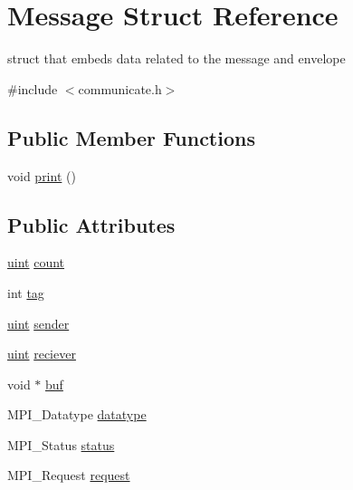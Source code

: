 \hypertarget{structMessage}{}\section{Message Struct Reference}
\label{structMessage}


struct that embeds data related to the message and envelope  




{\ttfamily \#include $<$communicate.\+h$>$}

\subsection*{Public Member Functions}
\begin{DoxyCompactItemize}
\item 
void \mbox{\hyperlink{structMessage_a9d9fb4752c49738110413a6c2c02ab2d}{print}} ()
\end{DoxyCompactItemize}
\subsection*{Public Attributes}
\begin{DoxyCompactItemize}
\item 
\mbox{\hyperlink{definitions_8h_a69aa29b598b851b0640aa225a9e5d61d}{uint}} \mbox{\hyperlink{structMessage_a66dd9a1c2793e7f4f5718b40eaa8f99a}{count}}
\item 
int \mbox{\hyperlink{structMessage_ab84b0b508c7dd4e3852ea4f12b4afe07}{tag}}
\item 
\mbox{\hyperlink{definitions_8h_a69aa29b598b851b0640aa225a9e5d61d}{uint}} \mbox{\hyperlink{structMessage_a377ce65ee6a414cb9ff14c344b34eda7}{sender}}
\item 
\mbox{\hyperlink{definitions_8h_a69aa29b598b851b0640aa225a9e5d61d}{uint}} \mbox{\hyperlink{structMessage_a294808f8950df933fc36bf178f0b0608}{reciever}}
\item 
void $\ast$ \mbox{\hyperlink{structMessage_abb937f76a19076be9c3ba4349db00707}{buf}}
\item 
M\+P\+I\+\_\+\+Datatype \mbox{\hyperlink{structMessage_a5b21bf981f0142f06d9b3193d1505057}{datatype}}
\item 
M\+P\+I\+\_\+\+Status \mbox{\hyperlink{structMessage_a45010e58ede78479ac2d94b99573cd2f}{status}}
\item 
M\+P\+I\+\_\+\+Request \mbox{\hyperlink{structMessage_a05ea0926cf9173c46d2284492530095a}{request}}
\end{DoxyCompactItemize}


